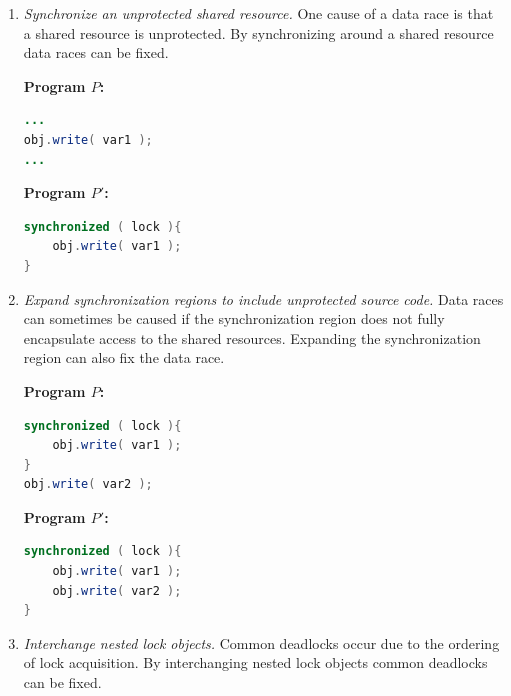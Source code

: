 \documentclass[10pt, conference, compsocconf]{IEEEtran}
\begin{document}
\begin{enumerate}
	\item \textit{Synchronize an unprotected shared resource.} One cause of a data race is that a shared resource is unprotected. By synchronizing around a shared resource data races can be fixed.

\vspace{2mm}
	\begin{minipage}{3.70cm}
	\footnotesize{\textbf{ Program $P$:}}
\begin{lstlisting}[language=Java]
...
obj.write( var1 );
...

\end{lstlisting}
\end{minipage}\hfill
\begin{minipage}{3.70cm}
\footnotesize{\textbf{ Program $P'$:}}
\begin{lstlisting}[language=Java]
synchronized ( lock ){
	obj.write( var1 );
}
\end{lstlisting}
\end{minipage}


	\item \textit{Expand synchronization regions to include unprotected source code.} Data races can sometimes be caused if the synchronization region does not fully encapsulate access to the shared resources. Expanding the synchronization region can also fix the data race.

\vspace{2mm}
	\begin{minipage}{3.70cm}
\footnotesize{\textbf{ Program $P$:}}
\begin{lstlisting}[language=Java]
synchronized ( lock ){
	obj.write( var1 );
}
obj.write( var2 );
\end{lstlisting}
\end{minipage}\hfill
\begin{minipage}{3.70cm}
\footnotesize{\textbf{ Program $P'$:}}
\begin{lstlisting}[language=Java]
synchronized ( lock ){
	obj.write( var1 );
	obj.write( var2 );
}
\end{lstlisting}
\end{minipage}


	\item \textit{Interchange nested lock objects.} Common deadlocks occur due to the ordering of lock acquisition. By interchanging nested lock objects common deadlocks can be fixed.


\end{enumerate}
\end{document}
